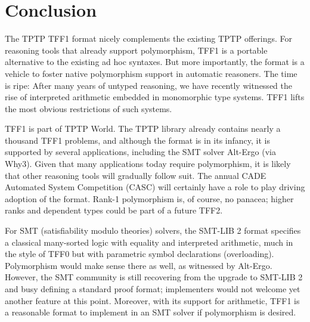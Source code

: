 \section{Conclusion}
\label{sec_concl}

The TPTP TFF1 format nicely complements the existing TPTP
offerings. %
For reasoning tools that already
support polymorphism, TFF1 is a portable alternative to the existing ad hoc
syntaxes. But more importantly, the format is a vehicle to foster native
polymorphism support in automatic reasoners.
The time is ripe: After many
years of untyped reasoning, we have recently witnessed the rise of
interpreted arithmetic embedded in monomorphic type systems. TFF1
lifts the most obvious restrictions of such systems.

TFF1 is part of TPTP World. The TPTP library already contains
nearly a thousand TFF1 problems, and although the format is in its
infancy, it is supported by several applications, including the SMT solver
Alt-Ergo (via Why3).
Given that many applications today require polymorphism, it
is likely that other reasoning tools will gradually follow suit.
The annual CADE Automated
System Competition (CASC) will certainly have a
role to play driving adoption of the format.
Rank-1 polymorphism is, of course, no panacea; higher ranks and dependent types
could be part of a future TFF2.

For SMT (satisfiability modulo theories) solvers, the SMT-LIB 2 format \cite{barrett-et-al-2010} specifies a
classical many-sorted logic with equality and interpreted arithmetic, much in
the style of TFF0 but with parametric symbol declarations (overloading).
Polymorphism would make sense there as well, as witnessed by Alt-Ergo.
However, the SMT community is still recovering from the %
upgrade to SMT-LIB 2 and busy defining a standard proof format;
implementers would %
not welcome yet another
feature at this point. Moreover, with its support for arithmetic, TFF1 is a
reasonable format to implement in an SMT solver if polymorphism is desired.

\def\ackname{Acknowledgment}
